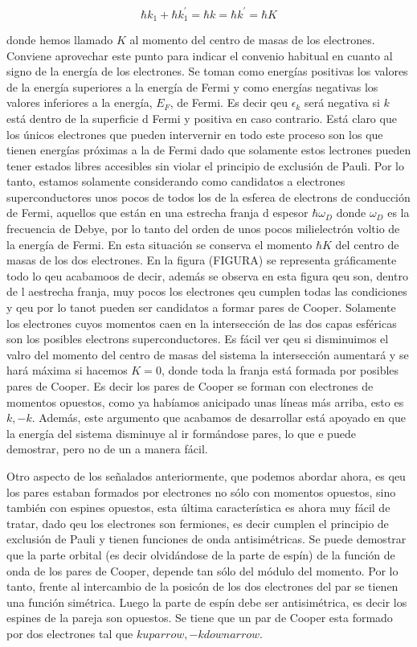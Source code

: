 \begin{equation*}
    \hbar k_1 + \hbar k_1^\prime = \hbar k = \hbar k^\prime = \hbar K
\end{equation*}

donde hemos llamado $K$ al momento del centro de masas de los electrones. Conviene aprovechar este punto para indicar el convenio habitual en cuanto al signo de la energía de los electrones. Se toman como energías positivas los valores de la energía superiores a la energía de Fermi y como energías negativas los valores inferiores a la energía, $E_F$, de Fermi. Es decir qeu $\epsilon_k$ será negativa si $k$ está dentro de la superficie d Fermi y positiva en caso contrario. Está claro que los únicos electrones que pueden intervernir en todo este proceso son los que tienen energías próximas a la de Fermi dado que solamente estos lectrones pueden tener estados libres accesibles sin violar el principio de exclusión de Pauli. Por lo tanto, estamos solamente considerando como candidatos a electrones superconductores unos pocos de todos los de la esferea de electrons de conducción de Fermi, aquellos que están en una estrecha franja d espesor $\hbar \omega_D$ donde $\omega_D$ es la frecuencia de Debye, por lo tanto del orden de unos pocos milielectrón voltio de la energía de Fermi. En esta situación se conserva el momento $\hbar K$ del centro de masas de los dos electrones. En la figura (FIGURA) se representa gráficamente todo lo qeu acabamoos de decir, además se observa en esta figura qeu son, dentro de l aestrecha franja, muy pocos los electrones qeu cumplen todas las condiciones y qeu por lo tanot pueden ser candidatos a formar pares de Cooper. Solamente los electrones cuyos momentos caen en la intersección de las dos capas esféricas son los posibles electrons superconductores. Es fácil ver qeu si disminuimos el valro del momento del centro de masas del sistema la intersección aumentará y se hará máxima si hacemos $K = 0$, donde toda la franja está formada por posibles pares de Cooper. Es decir los pares de Cooper se forman con electrones de momentos opuestos, como ya habíamos anicipado unas líneas más arriba, esto es $k, -k$.  Además, este argumento que acabamos de desarrollar está apoyado en que la energía del sistema disminuye al ir formándose pares, lo que e puede demostrar, pero no de un a manera fácil.

Otro aspecto de los señalados anteriormente, que podemos abordar ahora, es qeu los pares estaban formados por electrones no sólo con momentos opuestos, sino también con espines opuestos, esta última característica es ahora muy fácil de tratar, dado qeu los electrones son fermiones, es decir cumplen el principio de exclusión de Pauli y tienen funciones de onda antisimétricas. Se puede demostrar que la parte orbital (es decir olvidándose de la parte de espín) de la función de onda de los pares de Cooper, depende tan sólo del módulo del momento. Por lo tanto, frente al intercambio de la posicón de los dos electrones del par se tienen una función simétrica. Luego la parte de espín debe ser antisimétrica, es decir los espines de la pareja son opuestos. Se tiene que un par de Cooper esta formado por dos electrones tal que $k uparrow, -k downarrow$.

